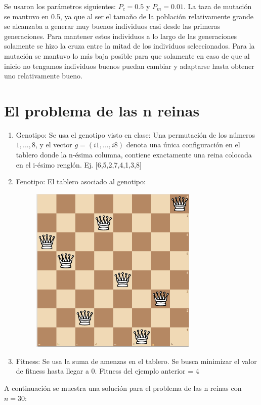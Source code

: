 \documentclass[11pt,letterpaper]{article}
\begin{document}
\begin{enumerate}[label=\alph*)]
        Se usaron los parámetros siguientes: $P_c = 0.5$ y $P_m = 0.01$. La taza de mutación se mantuvo en 0.5, ya que al ser el tamaño de la población relativamente grande se alcanzaba a generar muy buenos individuos casi desde las primeras generaciones. Para mantener estos individuos a lo largo de las generaciones solamente se hizo la cruza entre la mitad de los individuos seleccionados. Para la mutación se mantuvo lo más baja posible para que solamente en caso de que al inicio no tengamos individuos buenos puedan cambiar y adaptarse hasta obtener uno relativamente bueno.
    \end{enumerate}

    \section{El problema de las n reinas}
    \begin{enumerate}[label=\alph*)]
        \item Genotipo: Se usa el genotipo visto en clase: Una permutación de los números $1, ..., 8$, y el vector $g=(i1, ... , i8)$ denota una única configuración en el tablero donde la n-ésima columna, contiene exactamente una reina colocada en el i-ésimo renglón. Ej. [6,5,2,7,4,1,3,8]
        \item Fenotipo: El tablero asociado al genotipo:
            \begin{figure}[H]
            \centering
            \includegraphics[width=8cm]{images/reinas-fenotipo.png}
            \label{fig:reinas-fenotipo}
        \end{figure}
        \item Fitness: Se usa la suma de amenzas en el tablero. Se busca minimizar el valor de fitness hasta llegar a 0. Fitness del ejemplo anterior = 4
    \end{enumerate}
    A continuación se muestra una solución para el problema de las n reinas con $n=30$:
\end{document}
